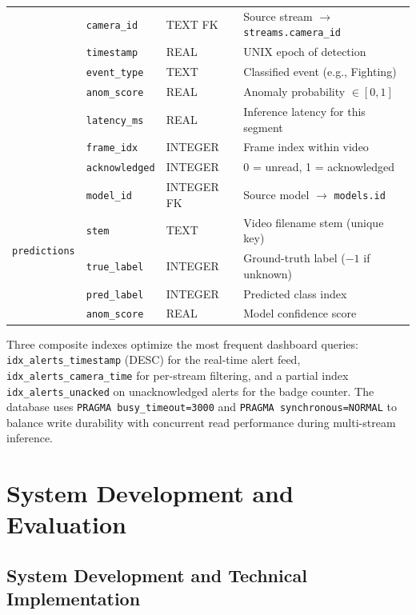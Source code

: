 \documentclass[12pt]{article}
\begin{document}
\begin{table}[H]
\begin{tabular}{llll}
            & \texttt{camera\_id}  & TEXT FK      & Source stream $\to$ \texttt{streams.camera\_id} \\
            & \texttt{timestamp}   & REAL         & UNIX epoch of detection \\
            & \texttt{event\_type} & TEXT         & Classified event (e.g., Fighting) \\
            & \texttt{anom\_score}  & REAL         & Anomaly probability $\in [0,1]$ \\
            & \texttt{latency\_ms} & REAL         & Inference latency for this segment \\
            & \texttt{frame\_idx}  & INTEGER      & Frame index within video \\
            & \texttt{acknowledged}& INTEGER      & 0 = unread, 1 = acknowledged \\
        \midrule
        \multirow{5}{*}{\texttt{predictions}}
            & \texttt{model\_id}   & INTEGER FK   & Source model $\to$ \texttt{models.id} \\
            & \texttt{stem}        & TEXT         & Video filename stem (unique key) \\
            & \texttt{true\_label} & INTEGER      & Ground-truth label ($-1$ if unknown) \\
            & \texttt{pred\_label} & INTEGER      & Predicted class index \\
            & \texttt{anom\_score} & REAL         & Model confidence score \\
        \bottomrule
    \end{tabular}
\end{table}

Three composite indexes optimize the most frequent dashboard queries: \texttt{idx\_alerts\_timestamp} (DESC) for the real-time alert feed, \texttt{idx\_alerts\_camera\_time} for per-stream filtering, and a partial index \texttt{idx\_alerts\_unacked} on unacknowledged alerts for the badge counter. The database uses \texttt{PRAGMA busy\_timeout=3000} and \texttt{PRAGMA synchronous=NORMAL} to balance write durability with concurrent read performance during multi-stream inference.

\clearpage
\section{System Development and Evaluation}

\subsection{System Development and Technical Implementation}
\end{document}
